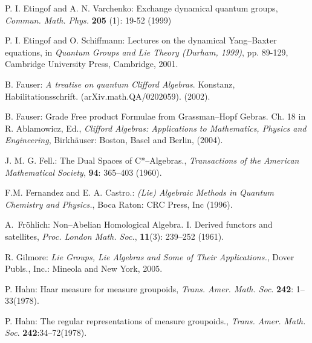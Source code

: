 \documentclass[12pt]{article}
\theoremstyle{plain}
\theoremstyle{definition}
\numberwithin{equation}{section}
\begin{document}
\begin{thebibliography}{99}
P. I. Etingof and A. N. Varchenko: Exchange dynamical quantum groups, \emph{Commun. Math. Phys.} \textbf{205} (1): 19-52 (1999)

P. I. Etingof and O. Schiffmann: Lectures on the dynamical Yang--Baxter equations, in \emph{Quantum Groups and Lie Theory (Durham, 1999)}, pp. 89-129, Cambridge University Press, Cambridge, 2001.

B. Fauser: \emph{A treatise on quantum Clifford Algebras}. Konstanz,
Habilitationsschrift. (arXiv.math.QA/0202059). (2002).

B. Fauser: Grade Free product Formulae from Grassman--Hopf Gebras.
Ch. 18 in R. Ablamowicz, Ed., \emph{Clifford Algebras: Applications to Mathematics, Physics and Engineering}, Birkh\"{a}user: Boston, Basel and Berlin, (2004).

J. M. G. Fell.: The Dual Spaces of  C*--Algebras., \emph{Transactions of the American
Mathematical Society}, \textbf{94}: 365--403 (1960).

F.M. Fernandez and E. A. Castro.:  \emph{(Lie) Algebraic Methods in Quantum Chemistry and Physics.}, Boca Raton: CRC Press, Inc  (1996).

A.~Fr{\"o}hlich: Non--Abelian Homological Algebra. {I}.
{D}erived functors and satellites, \emph{Proc. London Math. Soc.}, \textbf{11}(3): 239--252 (1961).

R. Gilmore: \emph{Lie Groups, Lie Algebras and Some of Their Applications.},
Dover Publs., Inc.: Mineola and New York, 2005.

P. Hahn: Haar measure for measure groupoids, \textit{Trans. Amer. Math. Soc}. \textbf{242}: 1--33(1978).

P. Hahn: The regular representations of measure groupoids., \textit{Trans. Amer. Math. Soc}. \textbf{242}:34--72(1978).

\end{thebibliography}
\end{document}
